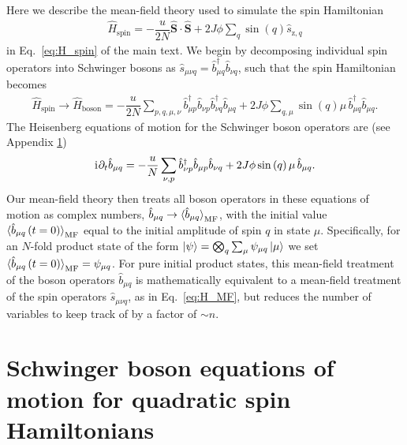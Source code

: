 \documentclass[aps,pra,nofootinbib,twocolumn,superscriptaddress]{revtex4-2}
\renewcommand{\t}{\text} %
\newcommand{\f}[2]{\dfrac{#1}{#2}} %
\newcommand{\p}[1]{\left(#1\right)} %
\newcommand{\bk}{\braket} %
\renewcommand{\i}{\mathrm{i}\mkern1mu} %
\newcommand{\1}{\mathds{1}}
\renewcommand{\b}{\hat{b}}
\newcommand{\s}{\hat{s}}
\renewcommand{\H}{\hat{H}}
\renewcommand{\S}{\hat{S}}
\newcommand{\z}{\text{z}}
\newcommand{\spin}{\text{spin}}
\newcommand{\MF}{\text{MF}}
\begin{document}
Here we describe the mean-field theory used to simulate the spin Hamiltonian
\begin{align}
  \H_\spin = -\f{u}{2N}\bm\S\cdot\bm\S + 2J\phi \sum_q \sin\p{q} \s_{\z,q}
\end{align}
in Eq.~\eqref{eq:H_spin} of the main text.
We begin by decomposing individual spin operators into Schwinger bosons as $\s_{\mu\nu q} = \b_{\mu q}^\dag \b_{\nu q}$, such that the spin Hamiltonian becomes
\begin{align}
  \H_\spin \to \H_{\t{boson}}
  = -\f{u}{2N} \sum_{p,q,\mu,\nu}
  \b_{\mu p}^\dag \b_{\nu p} \b_{\nu q}^\dag \b_{\mu q}
  + 2J\phi \sum_{q,\mu} \sin\p{q} \mu\, \b_{\mu q}^\dag \b_{\mu q}.
\end{align}
The Heisenberg equations of motion for the Schwinger boson operators are (see Appendix \ref{sec:bosons})
\begin{align}
  \i \partial_t \b_{\mu q}
  = -\f{u}{N} \sum_{\nu,p} \b_{\nu p}^\dag \b_{\mu p} \b_{\nu q}
  + 2J\phi \sin\p{q} \mu\, \b_{\mu q}.
\end{align}
Our mean-field theory then treats all boson operators in these equations of motion as complex numbers, $\b_{\mu q}\to\bk{\b_{\mu q}}_\MF$, with the initial value $\bk{\b_{\mu q}\p{t=0}}_\MF$ equal to the initial amplitude of spin $q$ in state $\mu$.
Specifically, for an $N$-fold product state of the form $\ket\psi=\bigotimes_q\sum_\mu\psi_{\mu q}\ket{\mu}$ we set $\bk{\b_{\mu q}\p{t=0}}_\MF = \psi_{\mu q}$.
For pure initial product states, this mean-field treatment of the boson operators $\b_{\mu q}$ is mathematically equivalent to a mean-field treatment of the spin operators $\s_{\mu\nu q}$, as in Eq.~\eqref{eq:H_MF}, but reduces the number of variables to keep track of by a factor of $\sim n$.

\section{Schwinger boson equations of motion for quadratic spin Hamiltonians}
\label{sec:bosons}
\end{document}
